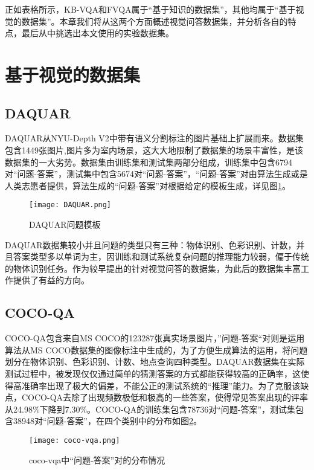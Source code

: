 正如表格所示，KB-VQA和FVQA属于“基于知识的数据集”，其他均属于“基于视觉的数据集”。本章我们将从这两个方面概述视觉问答数据集，并分析各自的特点，最后从中挑选出本文使用的实验数据集。

\section{基于视觉的数据集}
\subsection{DAQUAR}
DAQUAR从NYU-Depth V2中带有语义分割标注的图片基础上扩展而来。数据集包含1449张图片,图片多为室内场景，这大大地限制了数据集的场景丰富性，是该数据集的一大劣势。数据集由训练集和测试集两部分组成，训练集中包含6794对“问题-答案”，测试集中包含5674对“问题-答案”，“问题-答案”对由算法生成或是人类志愿者提供，算法生成的“问题-答案”对根据给定的模板生成，详见图\ref{DAQUAR}。
\begin{figure}[H]
	\texttt{[image: DAQUAR.png]}
	\caption{DAQUAR问题模板}
	\label{DAQUAR}
\end{figure}

DAQUAR数据集较小并且问题的类型只有三种：物体识别、色彩识别、计数，并且答案类型多以单词为主，因训练和测试系统复杂问题的推理能力较弱，偏于传统的物体识别任务。作为较早提出的针对视觉问答的数据集，为此后的数据集丰富工作提供了有益的方向。

\subsection{COCO-QA}
COCO-QA包含来自MS COCO的123287张真实场景图片，”问题-答案“对则是运用算法从MS COCO数据集的图像标注中生成的，为了方便生成算法的运用，将问题划分在物体识别、色彩识别、计数、地点查询四种类型。DAQUAR数据集在实际测试过程中，被发现仅仅通过简单的猜测答案的方式都能获得较高的正确率，这使得高准确率出现了极大的偏差，不能公正的测试系统的“推理”能力。为了克服该缺点，COCO-QA去除了出现频数极低和极高的一些答案，使得常见答案出现的评率从24.98\%下降到7.30\%。COCO-QA的训练集包含78736对“问题-答案”，测试集包含38948对“问题-答案”，在四个类别中的分布如图\ref{coco-vqa}。
\begin{figure}[H]
	\centering
	\texttt{[image: coco-vqa.png]}
	\caption{coco-vqa中“问题-答案”对的分布情况}
	\label{coco-vqa}
\end{figure}

